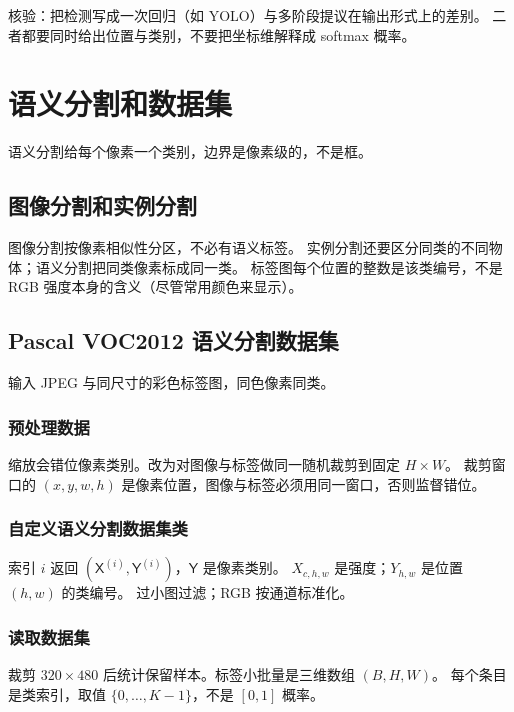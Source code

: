 核验：把检测写成一次回归（如 YOLO）与多阶段提议在输出形式上的差别。
二者都要同时给出位置与类别，不要把坐标维解释成 softmax 概率。

\section{语义分割和数据集}



语义分割给每个像素一个类别，边界是像素级的，不是框。

\subsection{图像分割和实例分割}

图像分割按像素相似性分区，不必有语义标签。
实例分割还要区分同类的不同物体；语义分割把同类像素标成同一类。
标签图每个位置的整数是该类编号，不是 RGB 强度本身的含义（尽管常用颜色来显示）。

\subsection{Pascal VOC2012 语义分割数据集}

输入 JPEG 与同尺寸的彩色标签图，同色像素同类。

\subsubsection{预处理数据}

缩放会错位像素类别。改为对图像与标签做同一随机裁剪到固定 $H\times W$。
裁剪窗口的 $(x,y,w,h)$ 是像素位置，图像与标签必须用同一窗口，否则监督错位。

\subsubsection{自定义语义分割数据集类}

索引 $i$ 返回 $(\mathsf{X}^{(i)},\mathsf{Y}^{(i)})$，$\mathsf{Y}$ 是像素类别。
$X_{c,h,w}$ 是强度；$Y_{h,w}$ 是位置 $(h,w)$ 的类编号。
过小图过滤；RGB 按通道标准化。

\subsubsection{读取数据集}

裁剪 $320\times 480$ 后统计保留样本。标签小批量是三维数组 $(B,H,W)$。
每个条目是类索引，取值 $\{0,\ldots,K-1\}$，不是 $[0,1]$ 概率。

